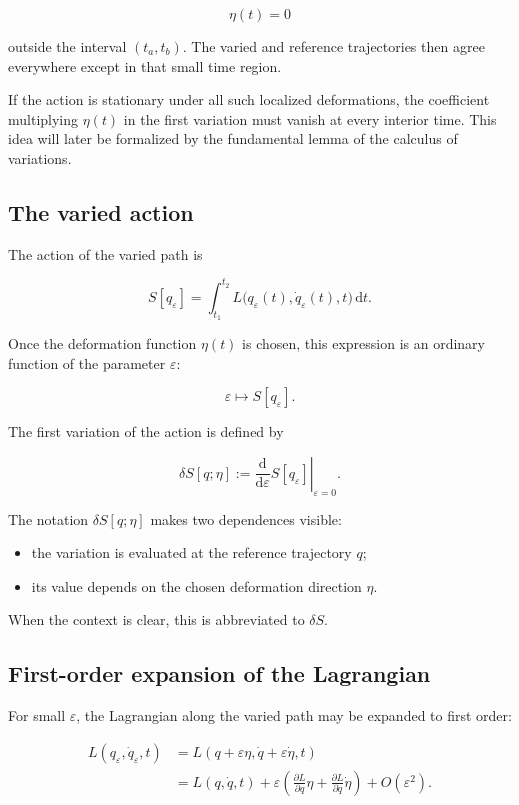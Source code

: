 \[
\eta(t)=0
\]

outside the interval \((t_{a},t_{b})\). The varied and reference trajectories then agree everywhere except in that small time region.

If the action is stationary under all such localized deformations, the coefficient multiplying \(\eta(t)\) in the first variation must vanish at every interior time. This idea will later be formalized by the fundamental lemma of the calculus of variations.

\subsection{The varied action}

The action of the varied path is

\[
S[q_{\varepsilon}]
=
\int_{t_{1}}^{t_{2}}
L\bigl(q_{\varepsilon}(t),\dot q_{\varepsilon}(t),t\bigr)
\,\mathrm{d}t.
\]

Once the deformation function \(\eta(t)\) is chosen, this expression is an ordinary function of the parameter \(\varepsilon\):

\[
\varepsilon
\longmapsto
S[q_{\varepsilon}].
\]

The first variation of the action is defined by

\[
\boxed{
\delta S[q;\eta]
:=
\left.
\frac{\mathrm{d}}{\mathrm{d}\varepsilon}
S[q_{\varepsilon}]
\right|_{\varepsilon=0}
}.
\]

The notation \(\delta S[q;\eta]\) makes two dependences visible:

\begin{itemize}
    \item the variation is evaluated at the reference trajectory \(q\);
    \item its value depends on the chosen deformation direction \(\eta\).
\end{itemize}

When the context is clear, this is abbreviated to \(\delta S\).

\subsection{First-order expansion of the Lagrangian}

For small \(\varepsilon\), the Lagrangian along the varied path may be expanded to first order:

\[
\begin{aligned}
L(q_{\varepsilon},\dot q_{\varepsilon},t)
&=
L(q+\varepsilon\eta,
\dot q+\varepsilon\dot\eta,t)\\
&=
L(q,\dot q,t)
+
\varepsilon
\left(
\frac{\partial L}{\partial q}\eta
+
\frac{\partial L}{\partial\dot q}\dot\eta
\right)
+
O(\varepsilon^{2}).
\end{aligned}
\]

